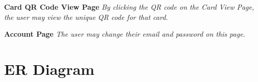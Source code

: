 \documentclass[12pt]{article}%
\begin{document}
\begin{center}
    \clearpage
    {\bf \Large Card QR Code View Page}
    {\it By clicking the QR code on the Card View Page, the user may view the unique QR code for that card.}

    \clearpage
    {\bf \Large Account Page}
    {\it The user may change their email and password on this page.}

\end{center}

\clearpage
\section{ER Diagram}
\end{document}
